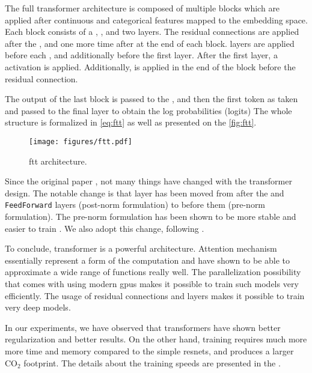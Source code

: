 The full transformer architecture is composed of multiple blocks which are applied after continuous and categorical
features mapped to the embedding space. Each block consists of a \LayerNorm, \MHA, and two \Linear
layers. The residual connections are applied after the \MHA, and one more time after at the end of each block.
\LayerNorm layers are applied before each \MHA, and additionally before the first \Linear layer. After the first \Linear
layer, a \GELU activation is applied. Additionally, \Dropout is applied in the end of the block before the residual
connection.

The output of the last block is passed to the \LayerNorm, and then the first token as taken and passed to the
final \Linear layer to obtain the log probabilities (logits) The whole structure is formalized in
\autoref{eq:ftt} as well as presented on the \autoref{fig:ftt}.


\begin{figure}[htbp]
    \centering
    \texttt{[image: figures/ftt.pdf]} \caption{\gls{ftt} architecture.}
    \label{fig:ftt}
\end{figure}


Since the original paper \cite{transformer}, not many things have changed with the transformer design. The notable
change is that \LayerNorm layer has been moved from after the \MHA and \texttt{FeedForward} layers
(post-norm formulation) to before them (pre-norm formulation). The pre-norm formulation has been shown to be more stable
and easier to train \cite{pre-norm}. We also adopt this change, following \cite{ft-transformer}.

To conclude, transformer is a powerful architecture. Attention mechanism essentially represent a form of the
computation and have shown to be able to approximate a wide range of functions really well. The parallelization
possibility that comes with using modern \gls{gpu}s makes it possible to train such models very efficiently. The usage
of residual connections and \LayerNorm layers makes it possible to train very deep models.

In our experiments, we have observed that transformers have shown better regularization and better results. On the other
hand, training requires much more more time and memory compared to the simple \glspl{resnet}, and produces a larger
$\text{CO}_2$ footprint. The details about the training speeds are presented in the .

